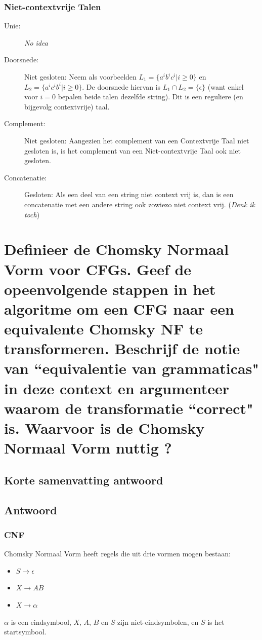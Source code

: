 \documentclass{article}
\begin{document}
        \subsubsection{Niet-contextvrije Talen}
            \begin{description}
                \item[Unie:] \textit{No idea}
                \item[Doorsnede:] Niet gesloten: Neem als voorbeelden $L_1 = \{a^i b^i c^i  \vert  i \geq 0\}$ en $L_2 = \{a^i c^i b^i  \vert  i \geq 0\}$. De doorsnede hiervan is $L_1 \cap L_2 = \{\epsilon\}$ (want enkel voor $i=0$ bepalen beide talen dezelfde string). Dit is een reguliere (en bijgevolg contextvrije) taal.
                \item[Complement:] Niet gesloten: Aangezien het complement van een Contextvrije Taal niet gesloten is, is het complement van een Niet-contextvrije Taal ook niet gesloten.
                \item[Concatenatie:] Gesloten: Als een deel van een string niet context vrij is, dan is een concatenatie met een andere string ook zowiezo niet context vrij. (\textit{Denk ik toch})
            \end{description}

\newpage
\section{Definieer de Chomsky Normaal Vorm voor CFGs. Geef de opeenvolgende stappen in het algoritme om een CFG naar een equivalente Chomsky NF te transformeren. Beschrijf de notie van ``equivalentie van grammaticas" in deze context en argumenteer waarom de transformatie ``correct" is. Waarvoor is de Chomsky Normaal Vorm nuttig ?}
    \subsection{Korte samenvatting antwoord}
        
    \subsection{Antwoord}
        \subsubsection{CNF}
            Chomsky Normaal Vorm heeft regels die uit drie vormen mogen bestaan:
            \begin{itemize}
                \item $S \rightarrow \epsilon$
                \item $X \rightarrow AB$
                \item $X \rightarrow \alpha$
            \end{itemize}
            $\alpha$ is een eindsymbool, $X$, $A$, $B$ en $S$ zijn niet-eindsymbolen, en $S$ is het startsymbool.
\end{document}
